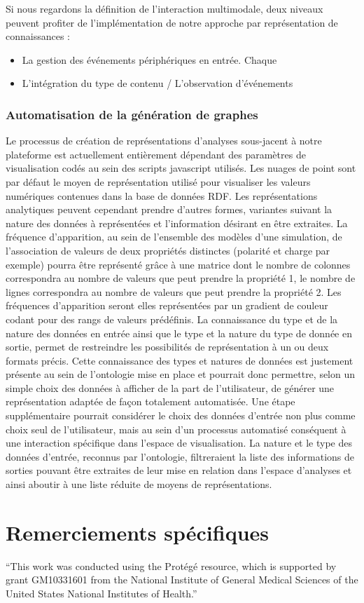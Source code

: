 Si nous regardons la définition de l'interaction multimodale, deux niveaux peuvent profiter de l'implémentation de notre approche par représentation de connaissances :

\begin{itemize}
	\item La gestion des événements périphériques en entrée. Chaque 
	\item L'intégration du type de contenu / L'observation d'événements
\end{itemize}



\subsubsection{Automatisation de la génération de graphes}

Le processus de création de représentations d'analyses sous-jacent à notre plateforme est actuellement entièrement dépendant des paramètres de visualisation codés au sein des scripts javascript utilisés. Les nuages de point sont par défaut le moyen de représentation utilisé pour visualiser les valeurs numériques contenues dans la base de données RDF. Les représentations analytiques peuvent cependant prendre d'autres formes, variantes suivant la nature des données à représentées et l'information désirant en être extraites. 
La fréquence d'apparition, au sein de l'ensemble des modèles d'une simulation, de l'association de valeurs de deux propriétés distinctes (polarité et charge par exemple) pourra être représenté grâce à une matrice dont le nombre de colonnes correspondra au nombre de valeurs que peut prendre la propriété 1, le nombre de lignes correspondra au nombre de valeurs que peut prendre la propriété 2. Les fréquences d'apparition seront elles représentées par un gradient de couleur codant pour des rangs de valeurs prédéfinis.
La connaissance du type et de la nature des données en entrée ainsi que le type et la nature du type de donnée en sortie, permet de restreindre les possibilités de représentation à un ou deux formats précis. Cette connaissance des types et natures de données est justement présente au sein de l'ontologie mise en place et pourrait donc permettre, selon un simple choix des données à afficher de la part de l'utilisateur, de générer une représentation adaptée de façon totalement automatisée. 
Une étape supplémentaire pourrait considérer le choix des données d'entrée non plus comme choix seul de l'utilisateur, mais au sein d'un processus automatisé conséquent à une interaction spécifique dans l'espace de visualisation. La nature et le type des données d'entrée, reconnus par l'ontologie, filtreraient la liste des informations de sorties pouvant être extraites de leur mise en relation dans l'espace d'analyses et ainsi aboutir à une liste réduite de moyens de représentations. 

\section*{Remerciements spécifiques}

“This work was conducted using the Protégé resource, which is supported by grant GM10331601 from the National Institute of General Medical Sciences of the United States National Institutes of Health.” 
